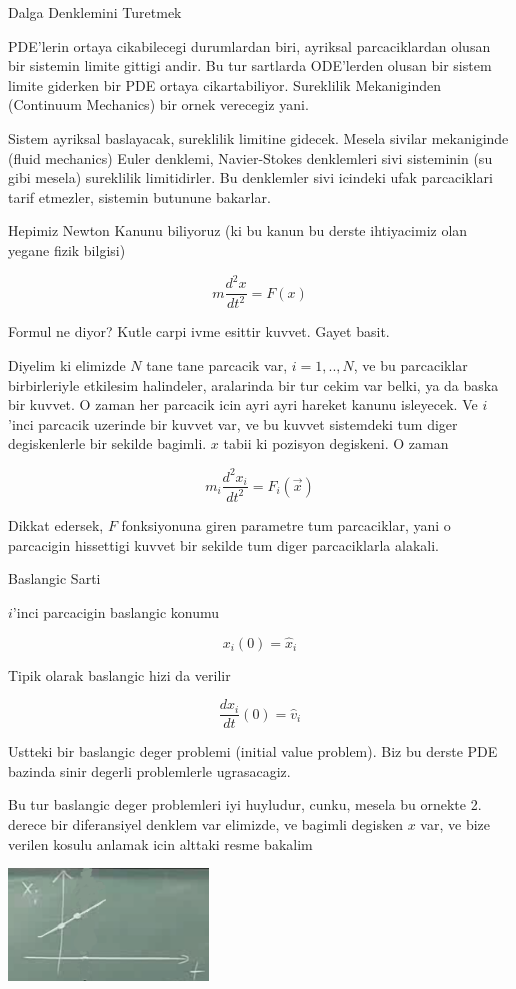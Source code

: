 \documentclass[12pt,fleqn]{article}
\begin{document}
Dalga Denklemini Turetmek 

PDE'lerin ortaya cikabilecegi durumlardan biri, ayriksal parcaciklardan
olusan bir sistemin limite gittigi andir. Bu tur sartlarda ODE'lerden
olusan bir sistem limite giderken bir PDE ortaya cikartabiliyor. Sureklilik
Mekaniginden (Continuum Mechanics) bir ornek verecegiz yani.

Sistem ayriksal baslayacak, sureklilik limitine gidecek. Mesela sivilar
mekaniginde (fluid mechanics) Euler denklemi, Navier-Stokes denklemleri
sivi sisteminin (su gibi mesela) sureklilik limitidirler. Bu denklemler
sivi icindeki ufak parcaciklari tarif etmezler, sistemin butunune
bakarlar. 

Hepimiz Newton Kanunu biliyoruz (ki bu kanun bu derste ihtiyacimiz olan
yegane fizik bilgisi)

\[ m \frac{d^2x}{dt^2} = F(x) \]

Formul ne diyor? Kutle carpi ivme esittir kuvvet. Gayet basit.

Diyelim ki elimizde $N$ tane tane parcacik var, $i=1,..,N$, ve bu
parcaciklar birbirleriyle etkilesim halindeler, aralarinda bir tur cekim
var belki, ya da baska bir kuvvet. O zaman her parcacik icin ayri ayri
hareket kanunu isleyecek. Ve $i$'inci parcacik uzerinde bir kuvvet var, ve
bu kuvvet sistemdeki tum diger degiskenlerle bir sekilde bagimli. $x$ tabii
ki pozisyon degiskeni. O zaman

\[ m_i \frac{d^2x_i}{dt^2} = F_i(\vec{x}) \]

Dikkat edersek, $F$ fonksiyonuna giren parametre tum parcaciklar, yani o
parcacigin hissettigi kuvvet bir sekilde tum diger parcaciklarla alakali. 

Baslangic Sarti

$i$'inci parcacigin baslangic konumu

\[ x_i(0) = \hat{x}_i \]

Tipik olarak baslangic hizi da verilir

\[ \frac{dx_i}{dt}(0) = \hat{v}_i \]

Ustteki bir baslangic deger problemi (initial value problem). Biz bu derste
PDE bazinda sinir degerli problemlerle ugrasacagiz. 

Bu tur baslangic deger problemleri iyi huyludur, cunku, mesela bu ornekte
2. derece bir diferansiyel denklem var elimizde, ve bagimli degisken $x$
var, ve bize verilen kosulu anlamak icin alttaki resme bakalim


\includegraphics[height=3cm]{1_06.png}
\end{document}
